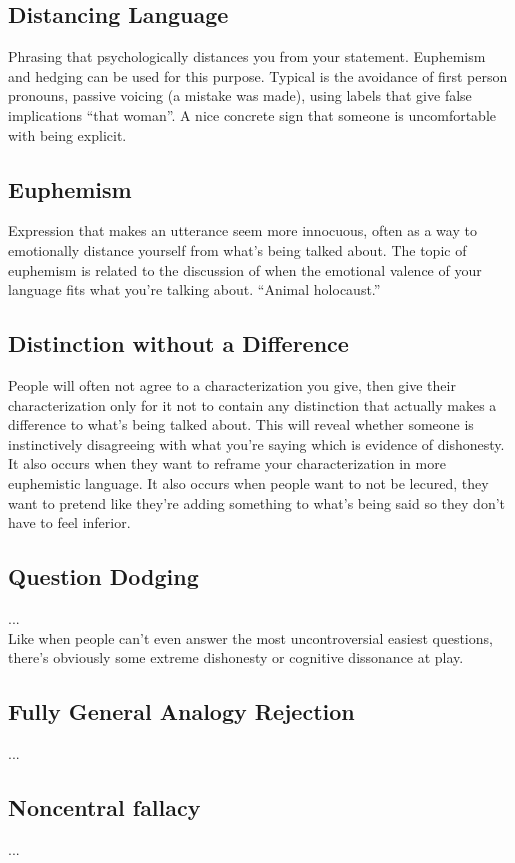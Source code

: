 \documentclass[12pt,english]{article}
\begin{document}
\subsection*{Distancing Language} Phrasing that psychologically distances you from your statement. Euphemism and hedging can be used for this purpose. Typical is the avoidance of first person pronouns, passive voicing (a mistake was made), using labels that give false implications “that woman”. A nice concrete sign that someone is uncomfortable with being explicit.

\subsection*{Euphemism} Expression that makes an utterance seem more innocuous, often as a way to emotionally distance yourself from what’s being talked about. The topic of euphemism is related to the discussion of when the emotional valence of your language fits what you’re talking about. “Animal holocaust.” 

\subsection*{Distinction without a Difference} People will often not agree to a characterization you give, then give their characterization only for it not to contain any distinction that actually makes a difference to what’s being talked about. This will reveal whether someone is instinctively disagreeing with what you’re saying which is evidence of dishonesty. It also occurs when they want to reframe your characterization in more euphemistic language. It also occurs when people want to not be lecured, they want to pretend like they're adding something to what's being said so they don't have to feel inferior.

\subsection*{Question Dodging} ...\\Like when people can't even answer the most uncontroversial easiest questions, there's obviously some extreme dishonesty or cognitive dissonance at play.

\subsection*{Fully General Analogy Rejection} ...

\subsection*{Noncentral fallacy} ...
\end{document}

